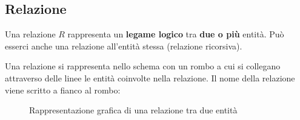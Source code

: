 \documentclass[a4paper]{article}
\begin{document}
\subsection{Relazione}
Una relazione \( R \) rappresenta un \textbf{legame logico} tra \textbf{due o più} entità.
Può esserci anche una relazione all'entità stessa (relazione ricorsiva).

\vspace{1em}
\noindent
Una relazione si rappresenta nello schema con un rombo a cui si collegano attraverso delle
linee le entità coinvolte nella relazione. Il nome della relazione viene scritto a fianco
al rombo:
\begin{figure}[H]
  \centering
  \caption{Rappresentazione grafica di una relazione tra due entità}
\end{figure}
\end{document}
